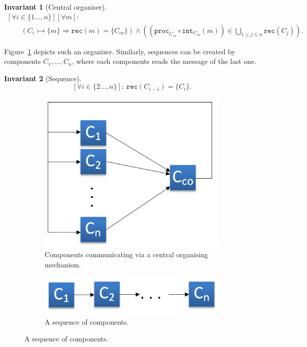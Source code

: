 \documentclass[]{scrartcl}
\theoremstyle{break}
\newtheorem{invariant}{Invariant}
\renewcommand{\tt}[1]{\texttt{#1}}
\newcommand{\cansend}[2]{#1 \rightarrowtail \{#2\}}
\newcommand{\rec}[1]{\tt{rec}(#1)}
\renewcommand{\int}[1]{\tt{int}_{#1}}
\newcommand{\proc}[1]{\tt{proc}_{#1}}
\begin{document}
\begin{invariant}[Central organiser]
$$
	\begin{array}{l}
	 [\forall i \in \{1\dots,n\}] [\forall m]:\\
	 \quad \quad \left(\cansend{C_i}{m} \Rightarrow \rec{m} = \{C_{co}\}\right) \wedge \left( \left( \proc{C_{co}} \circ \int{C_{co}}(m)  \right) \in \bigcup\limits_{1 \leq j \leq n} \rec{C_j} \right).
	\end{array}
$$
\end{invariant}

Figure~\ref{fig:centralOrganizer} depicts such an organizer. Similarly, sequences can be created by components $C_{1},\dots,C_{n}$, where each components reads the message of the last one.

\begin{invariant}[Sequence]
$$
	[\forall i \in \{2\dots,n\}]:\ \rec{C_{i-1}} = \{C_i\}.
$$
\end{invariant}

\begin{figure}
	\centering
	\begin{subfigure}[t]{0.45\textwidth}
		\includegraphics[width=\textwidth]{figs/c_co.png}
		\caption{Components communicating via a central organising mechanism.}
		\label{fig:centralOrganizer}
	\end{subfigure}
	\begin{subfigure}[t]{0.45\textwidth}
		\includegraphics[width=\textwidth]{figs/c_sequence.png}
		\caption{A sequence of components.}
		\label{fig:c_sequence}
	\end{subfigure}
\end{figure}
\end{document}
